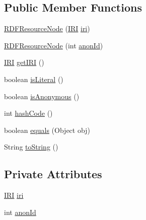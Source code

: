 \subsection*{Public Member Functions}
\begin{DoxyCompactItemize}
\item 
\hyperlink{classorg_1_1coode_1_1owlapi_1_1rdf_1_1model_1_1_r_d_f_resource_node_a95d58e2970ef0db76fb1cc6118088d00}{R\-D\-F\-Resource\-Node} (\hyperlink{classorg_1_1semanticweb_1_1owlapi_1_1model_1_1_i_r_i}{I\-R\-I} \hyperlink{classorg_1_1coode_1_1owlapi_1_1rdf_1_1model_1_1_r_d_f_resource_node_a7e6e57e11b925207f665f28cd06e2147}{iri})
\item 
\hyperlink{classorg_1_1coode_1_1owlapi_1_1rdf_1_1model_1_1_r_d_f_resource_node_a5b1b746ff857d04fe0d1a203f3705893}{R\-D\-F\-Resource\-Node} (int \hyperlink{classorg_1_1coode_1_1owlapi_1_1rdf_1_1model_1_1_r_d_f_resource_node_abaac8c51697586287ab04b15fec1da51}{anon\-Id})
\item 
\hyperlink{classorg_1_1semanticweb_1_1owlapi_1_1model_1_1_i_r_i}{I\-R\-I} \hyperlink{classorg_1_1coode_1_1owlapi_1_1rdf_1_1model_1_1_r_d_f_resource_node_aaeb4e3bd9f3952be6d8b6b60c50bda40}{get\-I\-R\-I} ()
\item 
boolean \hyperlink{classorg_1_1coode_1_1owlapi_1_1rdf_1_1model_1_1_r_d_f_resource_node_aa785d399ea85ee39581b10b4830cbd04}{is\-Literal} ()
\item 
boolean \hyperlink{classorg_1_1coode_1_1owlapi_1_1rdf_1_1model_1_1_r_d_f_resource_node_a6b195943405a67b97cc1fe3789f03a31}{is\-Anonymous} ()
\item 
int \hyperlink{classorg_1_1coode_1_1owlapi_1_1rdf_1_1model_1_1_r_d_f_resource_node_a6d158b9a79615e111628167127bef7b2}{hash\-Code} ()
\item 
boolean \hyperlink{classorg_1_1coode_1_1owlapi_1_1rdf_1_1model_1_1_r_d_f_resource_node_aa952bb82f4e2b78a78b1c3a26060f97c}{equals} (Object obj)
\item 
String \hyperlink{classorg_1_1coode_1_1owlapi_1_1rdf_1_1model_1_1_r_d_f_resource_node_a153003fc867566aeb00a21f651d107d3}{to\-String} ()
\end{DoxyCompactItemize}
\subsection*{Private Attributes}
\begin{DoxyCompactItemize}
\item 
\hyperlink{classorg_1_1semanticweb_1_1owlapi_1_1model_1_1_i_r_i}{I\-R\-I} \hyperlink{classorg_1_1coode_1_1owlapi_1_1rdf_1_1model_1_1_r_d_f_resource_node_a7e6e57e11b925207f665f28cd06e2147}{iri}
\item 
int \hyperlink{classorg_1_1coode_1_1owlapi_1_1rdf_1_1model_1_1_r_d_f_resource_node_abaac8c51697586287ab04b15fec1da51}{anon\-Id}
\end{DoxyCompactItemize}


